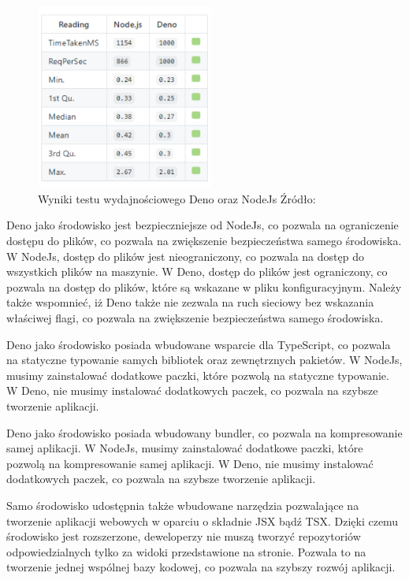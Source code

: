 \begin{figure}[H]
  \centering
  \includegraphics[width=0.52\textwidth]{Figures/deno_performance.png}
  \caption{Wyniki testu wydajnościowego Deno oraz NodeJs Źródło: \cite{deno_performance}}
  \label{fig:deno_vs_node}
\end{figure}

Deno jako środowisko jest bezpieczniejsze od NodeJs, co pozwala na ograniczenie dostępu do plików, co pozwala na zwiększenie bezpieczeństwa samego środowiska. W NodeJs, dostęp do plików jest nieograniczony, co pozwala na dostęp do wszystkich plików na maszynie. W Deno, dostęp do plików jest ograniczony, co pozwala na dostęp do plików, które są wskazane w pliku konfiguracyjnym. Należy także wspomnieć, iż Deno także nie zezwala na ruch sieciowy bez wskazania właściwej flagi, co pozwala na zwiększenie bezpieczeństwa samego środowiska.

Deno jako środowisko posiada wbudowane wsparcie dla TypeScript, co pozwala na statyczne typowanie samych bibliotek oraz zewnętrznych pakietów. W NodeJs, musimy zainstalować dodatkowe paczki, które pozwolą na statyczne typowanie. W Deno, nie musimy instalować dodatkowych paczek, co pozwala na szybsze tworzenie aplikacji.

Deno jako środowisko posiada wbudowany bundler, co pozwala na kompresowanie samej aplikacji. W NodeJs, musimy zainstalować dodatkowe paczki, które pozwolą na kompresowanie samej aplikacji. W Deno, nie musimy instalować dodatkowych paczek, co pozwala na szybsze tworzenie aplikacji.

Samo środowisko udostępnia także wbudowane narzędzia pozwalające na tworzenie aplikacji webowych w oparciu o składnie JSX bądź TSX. Dzięki czemu środowisko jest rozszerzone, deweloperzy nie muszą tworzyć repozytoriów odpowiedzialnych tylko za widoki przedstawione na stronie. Pozwala to na tworzenie jednej wspólnej bazy kodowej, co pozwala na szybszy rozwój aplikacji.

